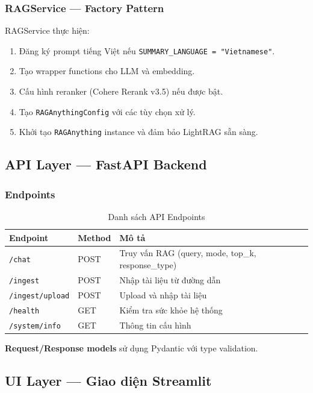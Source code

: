 \documentclass[12pt,a4paper]{article}
\begin{document}
\subsubsection{RAGService --- Factory Pattern}

RAGService thực hiện:
\begin{enumerate}
  \item Đăng ký prompt tiếng Việt nếu \texttt{SUMMARY\_LANGUAGE = "Vietnamese"}.
  \item Tạo wrapper functions cho LLM và embedding.
  \item Cấu hình reranker (Cohere Rerank v3.5) nếu được bật.
  \item Tạo \texttt{RAGAnythingConfig} với các tùy chọn xử lý.
  \item Khởi tạo \texttt{RAGAnything} instance và đảm bảo LightRAG sẵn sàng.
\end{enumerate}

\subsection{API Layer --- FastAPI Backend}

\subsubsection{Endpoints}

\begin{table}[H]
\centering
\caption{Danh sách API Endpoints}
\begin{tabular}{p{3.5cm}p{3cm}p{6.5cm}}
\toprule
\textbf{Endpoint} & \textbf{Method} & \textbf{Mô tả} \\
\midrule
\texttt{/chat} & POST & Truy vấn RAG (query, mode, top\_k, response\_type) \\
\texttt{/ingest} & POST & Nhập tài liệu từ đường dẫn \\
\texttt{/ingest/upload} & POST & Upload và nhập tài liệu \\
\texttt{/health} & GET & Kiểm tra sức khỏe hệ thống \\
\texttt{/system/info} & GET & Thông tin cấu hình \\
\bottomrule
\end{tabular}
\end{table}

\textbf{Request/Response models} sử dụng Pydantic với type validation.

\subsection{UI Layer --- Giao diện Streamlit}
\end{document}
